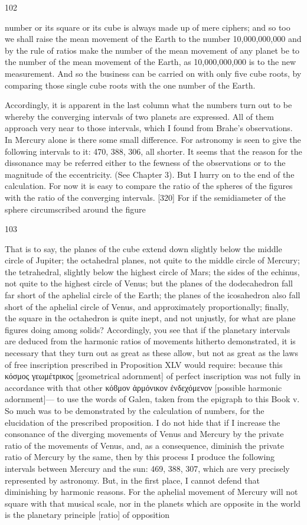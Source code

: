 \documentclass{article}
\begin{document}
102

number or its square or its cube is always made up of mere ciphers; and
so too we shall raise the mean movement of the Earth to the number
10,000,000,000 and by the rule of ratios make the number of the mean
movement of any planet be to the number of the mean movement of the
Earth, as 10,000,000,000 is to the new measurement. And so the
business can be carried on with only five cube roots, by comparing those
single cube roots with the one number of the Earth.

Accordingly, it is apparent in the last column what the numbers turn out
to be whereby the converging intervals of two planets are expressed. All
of them approach very near to those intervals, which I found from
Brahe's observations. In Mercury alone is there some small difference.
For astronomy is seen to give the following intervals to it: 470, 388, 306,
all shorter. It seems that the reason for the dissonance may be referred
either to the fewness of the observations or to the magnitude of the
eccentricity. (See Chapter 3). But I hurry on to the end of the calculation.
For now it is easy to compare the ratio of the spheres of the figures with
the ratio of the converging intervals.
[320] For if the semidiameter of the sphere circumscribed around the
figure


103

That is to say, the planes of the cube extend down slightly below the
middle circle of Jupiter; the octahedral planes, not quite to the middle
circle of Mercury; the tetrahedral, slightly below the highest circle of
Mars; the sides of the echinus, not quite to the highest circle of Venus;
but the planes of the dodecahedron fall far short of the aphelial circle of
the Earth; the planes of the icosahedron also fall short of the aphelial
circle of Venus, and approximately proportionally; finally, the square in
the octahedron is quite inept, and not unjustly, for what are plane figures
doing among solids? Accordingly, you see that if the planetary intervals
are deduced from the harmonic ratios of movements hitherto
demonstrated, it is necessary that they turn out as great as these allow,
but not as great as the laws of free inscription prescribed in Proposition
XLV would require: because this κόσμος γεωμέτρικος [geometrical
adornment] of perfect inscription was not fully in accordance with that
other κόϐμον ἁρμόνικον ἐνδεχόμενον [possible harmonic adornment]—
to use the words of Galen, taken from the epigraph to this Book v. So
much was to be demonstrated by the calculation of numbers, for the
elucidation of the prescribed proposition.
I do not hide that if I increase the consonance of the diverging
movements of Venus and Mercury by the private ratio of the movements
of Venus, and, as a consequence, diminish the private ratio of Mercury
by the same, then by this process I produce the following intervals
between Mercury and the sun: 469, 388, 307, which are very precisely
represented by astronomy. But, in the first place, I cannot defend that
diminishing by harmonic reasons. For the aphelial movement of
Mercury will not square with that musical scale, nor in the planets which
are opposite in the world is the planetary principle [ratio] of opposition
\end{document}
